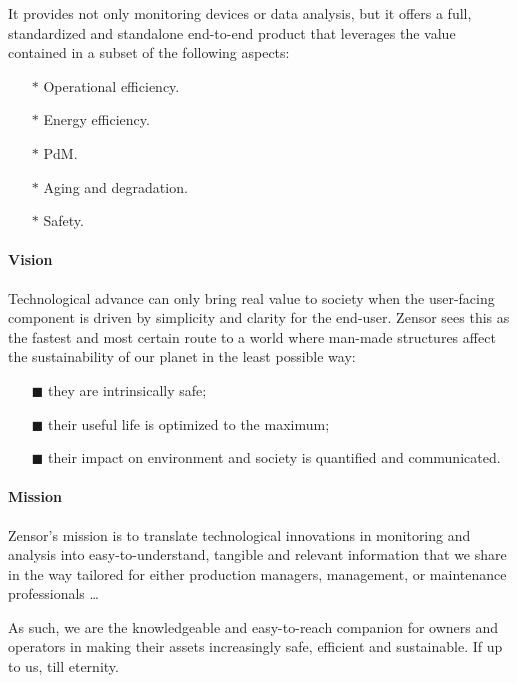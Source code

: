 It provides not only monitoring devices or data analysis, but it offers a full, standardized and standalone end-to-end product that leverages the value contained in a subset of the following aspects:
\begin{multicols}{2}
    \begin{itemize} 
        \item[$\ast$] Operational efficiency.
        \item[$\ast$] Energy efficiency. 
        \item[$\ast$] \acl{PdM}.
        \item[$\ast$] Aging and degradation.
        \item[$\ast$] Safety.
    \end{itemize}
\end{multicols}

\paragraph{Vision} 
Technological advance can only bring real value to society when the user-facing component is driven by simplicity and clarity for the end-user. 
Zensor sees this as the fastest and most certain route to a world where man-made structures affect the sustainability of our planet in the least possible way:
\begin{enumerate}
    \item[$\blacksquare$] they are intrinsically safe;
    \item[$\blacksquare$] their useful life is optimized to the maximum;
    \item[$\blacksquare$] their impact on environment and society is quantified and communicated.
\end{enumerate}

\paragraph{Mission}
Zensor's mission is to translate technological innovations in monitoring and analysis into easy-to-understand, tangible and relevant information that we share in the way tailored for either production managers,
management, or maintenance professionals \dots \par
As such, we are the knowledgeable and easy-to-reach companion for owners and operators in making their assets increasingly safe, efficient and sustainable. If up to us, till eternity.